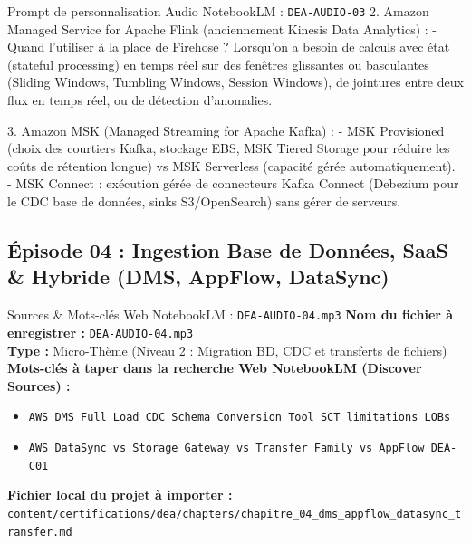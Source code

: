 \documentclass[11pt,a4paper]{article}
\begin{document}
\begin{promptbox}{Prompt de personnalisation Audio NotebookLM : \texttt{DEA-AUDIO-03}}
2. Amazon Managed Service for Apache Flink (anciennement Kinesis Data Analytics) :
- Quand l'utiliser à la place de Firehose ? Lorsqu'on a besoin de calculs avec état (stateful processing) en temps réel sur des fenêtres glissantes ou basculantes (Sliding Windows, Tumbling Windows, Session Windows), de jointures entre deux flux en temps réel, ou de détection d'anomalies.

3. Amazon MSK (Managed Streaming for Apache Kafka) :
- MSK Provisioned (choix des courtiers Kafka, stockage EBS, MSK Tiered Storage pour réduire les coûts de rétention longue) vs MSK Serverless (capacité gérée automatiquement).
- MSK Connect : exécution gérée de connecteurs Kafka Connect (Debezium pour le CDC base de données, sinks S3/OpenSearch) sans gérer de serveurs.
\end{promptbox}

\subsection{Épisode 04 : Ingestion Base de Données, SaaS \& Hybride (DMS, AppFlow, DataSync)}
\begin{sourcebox}{Sources \& Mots-clés Web NotebookLM : \texttt{DEA-AUDIO-04.mp3}}
\textbf{Nom du fichier à enregistrer :} \texttt{DEA-AUDIO-04.mp3}\\
\textbf{Type :} Micro-Thème (Niveau 2 : Migration BD, CDC et transferts de fichiers)\\
\textbf{Mots-clés à taper dans la recherche Web NotebookLM (Discover Sources) :}
\begin{itemize}[noitemsep]
    \item \texttt{AWS DMS Full Load CDC Schema Conversion Tool SCT limitations LOBs}
    \item \texttt{AWS DataSync vs Storage Gateway vs Transfer Family vs AppFlow DEA-C01}
\end{itemize}
\textbf{Fichier local du projet à importer :}
\texttt{content/certifications/dea/chapters/chapitre_04_dms_appflow_datasync_transfer.md}
\end{sourcebox}
\end{document}
